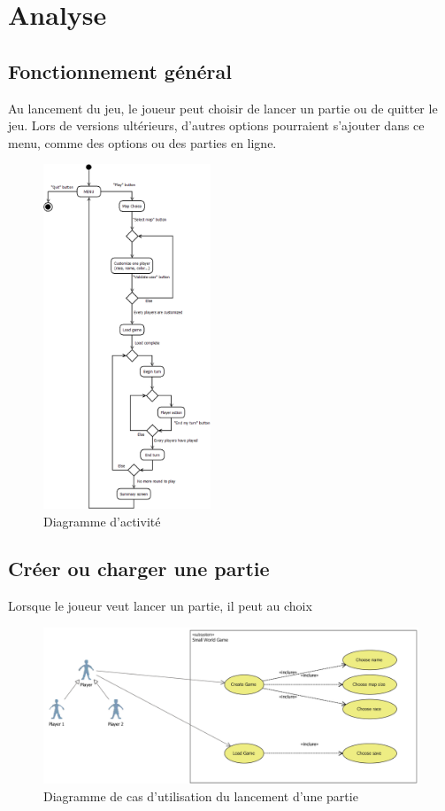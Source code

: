 \section{Analyse}

\subsection{Fonctionnement général}

Au lancement du jeu, le joueur peut choisir de lancer un partie ou de quitter le jeu. Lors de versions ultérieurs, d'autres options pourraient s'ajouter dans ce menu, comme des options ou des parties en ligne.

\begin{figure}[h]
  \centering
  \includegraphics[width=5cm]{schemas/activity.png}
  \caption{Diagramme d'activité}
  \label{activity}
\end{figure}




\subsection{Créer ou charger une partie}

Lorsque le joueur veut lancer un partie, il peut au choix

\begin{figure}[h]
  \centering
  \includegraphics[width=13cm]{schemas/uc_game_creation.png}
  \caption{Diagramme de cas d'utilisation du lancement d'une partie}
  \label{uc_game_creation}
\end{figure}


